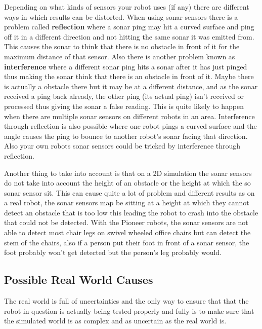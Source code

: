\documentclass[a4paper,12pt]{article}
\begin{document}
\noindent Depending on what kinds of sensors your robot uses (if any) there are different ways in which results can be distorted. When using sonar sensors there is a problem called \textbf{reflection} where a sonar ping may hit a curved surface and ping off it in a different direction and not hitting the same sonar it was emitted from. This causes the sonar to think that there is no obstacle in front of it for the maximum distance of that sensor. Also there is another problem known as \textbf{interference} where a different sonar ping hits a sonar after it has just pinged thus making the sonar think that there is an obstacle in front of it. Maybe there is actually a obstacle there but it may be at a different distance, and as the sonar received a ping back already, the other ping (its actual ping) isn't received or processed thus giving the sonar a false reading. This is quite likely to happen when there are multiple sonar sensors on different robots in an area. Interference through reflection is also possible where one robot pings a curved surface and the angle causes the ping to bounce to another robot's sonar facing that direction. Also your own robots sonar sensors could be tricked by interference through reflection.

\vspace{5mm}
\noindent Another thing to take into account is that on a 2D simulation the sonar sensors do not take into account the height of an obstacle or the height at which the so sonar sensor sit. This can cause quite a lot of problem and different results as on a real robot, the sonar sensors map be sitting at a height at which they cannot detect an obstacle that is too low this leading the robot to crash into the obstacle that could not be detected. With the Pioneer robots, the sonar sensors are not able to detect most chair legs on swivel wheeled office chairs but can detect the stem of the chairs, also if a person put their foot in front of a sonar sensor, the foot probably won't get detected but the person's leg probably would.

\subsection{Possible Real World Causes}

\noindent The real world is full of uncertainties and the only way to ensure that that the robot in question is actually being tested properly and fully is to make sure that the simulated world is as complex and as uncertain as the real world is.
\end{document}
